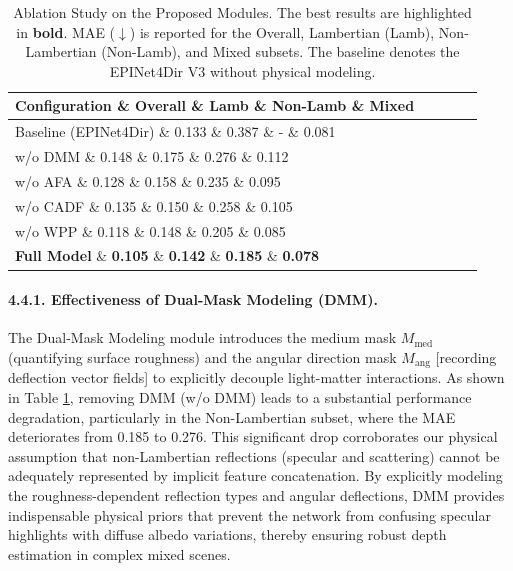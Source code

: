 \documentclass[lettersize,journal]{IEEEtran}
\begin{document}
\begin{table}[htbp]
\centering
\caption{Ablation Study on the Proposed Modules. The best results are highlighted in \textbf{bold}. MAE ($\downarrow$) is reported for the Overall, Lambertian (Lamb), Non-Lambertian (Non-Lamb), and Mixed subsets. The baseline denotes the EPINet4Dir V3 without physical modeling.}
\label{tab:ablation}
\renewcommand{\arraystretch}{1.2}
\begin{tabular}{lcccc}
\toprule
\textbf{Configuration} \& \textbf{Overall} \& \textbf{Lamb} \& \textbf{Non-Lamb} \& \textbf{Mixed} \\
\midrule
Baseline (EPINet4Dir) \& 0.133 \& 0.387 \& - \& 0.081 \\
\midrule
w/o DMM \& 0.148 \& 0.175 \& 0.276 \& 0.112 \\
w/o AFA \& 0.128 \& 0.158 \& 0.235 \& 0.095 \\
w/o CADF \& 0.135 \& 0.150 \& 0.258 \& 0.105 \\
w/o WPP \& 0.118 \& 0.148 \& 0.205 \& 0.085 \\
\midrule
\textbf{Full Model} \& \textbf{0.105} \& \textbf{0.142} \& \textbf{0.185} \& \textbf{0.078} \\
\bottomrule
\end{tabular}
\end{table}

\paragraph{4.4.1. Effectiveness of Dual-Mask Modeling (DMM).}
The Dual-Mask Modeling module introduces the medium mask $M_{\text{med}}$ (quantifying surface roughness) and the angular direction mask $M_{\text{ang}}$  [recording deflection vector fields] to explicitly decouple light-matter interactions. As shown in Table \ref{tab:ablation}, removing DMM (w/o DMM) leads to a substantial performance degradation, particularly in the Non-Lambertian subset, where the MAE deteriorates from 0.185 to 0.276. This significant drop corroborates our physical assumption that non-Lambertian reflections (specular and scattering) cannot be adequately represented by implicit feature concatenation. By explicitly modeling the roughness-dependent reflection types and angular deflections, DMM provides indispensable physical priors that prevent the network from confusing specular highlights with diffuse albedo variations, thereby ensuring robust depth estimation in complex mixed scenes.
\end{document}
